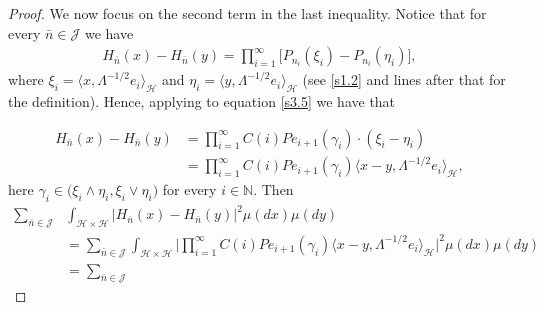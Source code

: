 \documentclass[]{interact}
\newcommand{\IN}{{\mathbb N}}
\theoremstyle{plain}%
\theoremstyle{definition}
\theoremstyle{remark}
\begin{document}
\begin{proof}
        We now focus on the second term in the last inequality. Notice that for 
        every
        $\bar n\in \mathcal{J}$ we have
        \begin{align}\label{s3.5}
            H_{\bar n}(x) - H_{\bar n}(y) =
                \prod_{i = 1} ^ \infty
            \Big[
                P_{n_i}( \xi_i ) - P_{n_i} (\eta_i)
            \Big],
        \end{align}
        where $\xi_i= \langle x,\Lambda^{-1/2}e_i\rangle_{\mathcal{H}}$ and 
        $\eta_i=
        \langle y,\Lambda^{-1/2}e_i\rangle_{\mathcal{H}}$
        (see \eqref{s1.2} and lines after that for the definition).
        Hence, applying  to equation \eqref{s3.5} we have that
        
        \begin{equation}
        \label{s3.6}
        \begin{aligned}
            H_{\bar n}(x)-H_{\bar n}(y)&=\prod_{i=1}^\infty 
            C(i)Pe_{i+1}(\gamma_i)
            \cdot
            (\xi_i-\eta_i)
            \\
            &=
            \prod_{i=1}^\infty
            C(i)Pe_{i+1}(\gamma_i)
            \langle
                x-y, \Lambda^{-1/2}e_i
            \rangle_{\mathcal{H}},
         \end{aligned}
        \end{equation}
        here $\gamma_i\in \big(\xi_i\wedge\eta_i, \xi_i\vee \eta_i  \big)$
        for every $i\in \IN$.
        Then
        \begin{equation}
            \label{s3.8}
            \begin{aligned}
                \sum_{\bar n\in \mathcal{J}}
                &
                \int_{\mathcal{H}\times \mathcal{H}}
                    \big|
                        H_{\bar n}(x) -H_{\bar n}(y)
                    \big|^2
                \mu(dx)\mu(dy)
                \\
                &=
                \sum_{\bar n\in \mathcal{J}}
                    \int_{\mathcal{H}\times \mathcal{H}}
                        \Big|
                            \prod_{i=1}^\infty C(i)Pe_{i+1}(\gamma_i)
                            \langle
                                x-y,
                                \Lambda^{-1/2}e_i
                            \rangle_{\mathcal{H}}
                        \Big|^2
                \mu(dx)\mu(dy)
                \\
                &=
                \sum_{\bar n\in \mathcal{J}}

\end{aligned}
\end{equation}
\end{proof}
\end{document}
